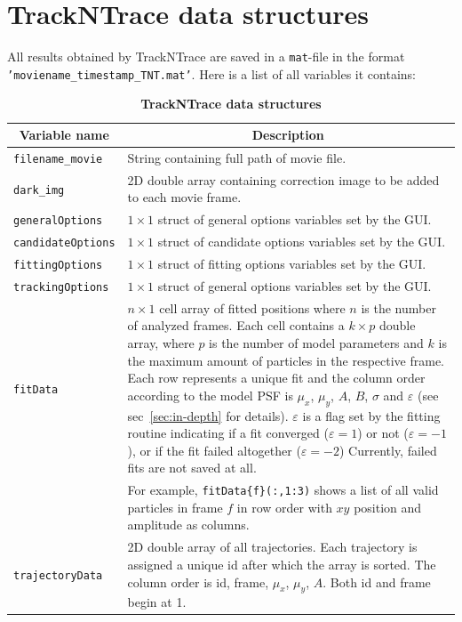 \documentclass[11pt,onside]{report}
\numberwithin{equation}{chapter}
\begin{document}
\section{TrackNTrace data structures}
All results obtained by TrackNTrace are saved in a \texttt{mat}-file in the format \texttt{'moviename\_timestamp\_TNT.mat'}. Here is a list of all variables it contains:
\begin{table}[!h]
\centering
\caption*{\textbf{TrackNTrace data structures}}
\label{tab:datastruct}
\begin{tabular}{p{} p{}}
\toprule
\multicolumn{1}{c}{Variable name} & \multicolumn{1}{c}{Description}\\ \midrule
\texttt{filename\_movie} & String containing full path of movie file. \\[5pt]
\texttt{dark\_img} & 2D double array containing correction image to be added to each movie frame. \\[5pt]
\texttt{generalOptions} & $1\times1$ struct of general options variables set by the GUI. \\[5pt]
\texttt{candidateOptions} & $1\times1$ struct of candidate options variables set by the GUI. \\[5pt]
\texttt{fittingOptions} & $1\times1$ struct of fitting options variables set by the GUI. \\[5pt]
\texttt{trackingOptions} & $1\times1$ struct of general options variables set by the GUI. \\[5pt]
\texttt{fitData} & $n\times 1$ cell array of fitted positions where $n$ is the number of analyzed frames. Each cell contains a $k\times p$ double array, where $p$ is the number of model parameters and $k$ is the maximum amount of particles in the respective frame. Each row represents a unique fit and the column order according to the model PSF is $\mu_x$, $\mu_y$, $A$, $B$, $\sigma$ and $\varepsilon$ (see sec~\ref{sec:in-depth} for details). $\varepsilon$ is a flag set by the fitting routine indicating if a fit converged ($\varepsilon = 1$) or not ($\varepsilon = -1$), or if the fit failed altogether ($\varepsilon = -2$) Currently, failed fits are not saved at all. \\
 & For example, \texttt{fitData\{f\}(:,1:3)} shows a list of all valid particles in frame $f$ in row order with $xy$ position and amplitude as columns.\\[5pt]
\texttt{trajectoryData} & 2D double array of all trajectories. Each trajectory is assigned a unique id after which the array is sorted. The column order is id, frame, $\mu_x$, $\mu_y$, $A$. Both id and frame begin at 1. \\
\bottomrule
\end{tabular}
\end{table}
\end{document}
